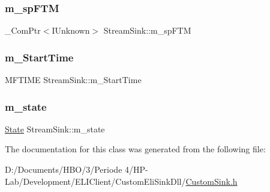 \mbox{\label{class_stream_sink_a678200461948ded6235ee7db32157f14}} 
\subsubsection{\texorpdfstring{m\+\_\+sp\+F\+TM}{m\_spFTM}}
{\footnotesize\ttfamily \+\_\+\+Com\+Ptr$<$I\+Unknown$>$ Stream\+Sink\+::m\+\_\+sp\+F\+TM\hspace{0.3cm}{\ttfamily [private]}}

\mbox{\label{class_stream_sink_ae81092995e38117c785f0d81f9018436}} 
\subsubsection{\texorpdfstring{m\+\_\+\+Start\+Time}{m\_StartTime}}
{\footnotesize\ttfamily M\+F\+T\+I\+ME Stream\+Sink\+::m\+\_\+\+Start\+Time\hspace{0.3cm}{\ttfamily [private]}}

\mbox{\label{class_stream_sink_a3bd92ea8f8b6d99790c51e638784499d}} 
\subsubsection{\texorpdfstring{m\+\_\+state}{m\_state}}
{\footnotesize\ttfamily \hyperlink{class_stream_sink_acc9030ca2dc258ca0fa57ce0b34b9ddd}{State} Stream\+Sink\+::m\+\_\+state\hspace{0.3cm}{\ttfamily [private]}}



The documentation for this class was generated from the following file\+:\begin{DoxyCompactItemize}
\item 
D\+:/\+Documents/\+H\+B\+O/3/\+Periode 4/\+H\+P-\/\+Lab/\+Development/\+E\+L\+I\+Client/\+Custom\+Eli\+Sink\+Dll/\hyperlink{_custom_sink_8h}{Custom\+Sink.\+h}\end{DoxyCompactItemize}
